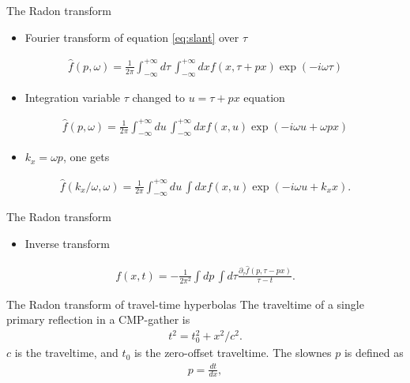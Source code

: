 \documentclass[xcolor=dvipsnames,notes]{beamer}
\begin{document}
%
\begin{frame}{The Radon transform}
\begin{itemize}
 \item Fourier transform of equation \eqref{eq:slant} over $\tau$
\end{itemize}
%
\begin{eqnarray}
  \hat{f}(p,\omega) =   
      \frac{1}{2\pi}\int^{+\infty}_{-\infty}d\tau\,\int^{+\infty}_{-\infty} dx f(x,\tau+px)\exp(-i\omega\tau) 
                   \label{eq:slant-four}
\end{eqnarray}
%
\begin{itemize}
\item Integration variable $\tau$  changed to $u=\tau+px$ equation
\end{itemize}
\begin{eqnarray}
  \hat{f}(p,\omega) =
      \frac{1}{2\pi}\int^{+\infty}_{-\infty}du\,\int^{+\infty}_{-\infty} dx f(x,u)\exp(-i\omega u + \omega px)
                   \label{eq:slant-four2}
\end{eqnarray}
\begin{itemize}
 \item $k_x = \omega p$, one gets
\end{itemize}
\begin{eqnarray}
  \hat{f}(k_x/\omega,\omega) =
      \frac{1}{2\pi}\int^{+\infty}_{-\infty}du\,\int dx f(x,u)\exp(-i\omega u + k_x x).
                   \label{eq:slant-four2b}
\end{eqnarray}
\end{frame}
\begin{frame}{The Radon transform}
\sf
\begin{itemize}
  \item Inverse transform
\end{itemize}
%
\begin{eqnarray}
  f(x,t) = -\frac{1}{2\pi^2}\int dp\,\int d\tau\frac{\partial_{\tau}\hat{f}(p,\tau-px)} 
                                                   {\tau-t}.         
\end{eqnarray}
%
\end{frame}
%
\begin{frame}{The Radon transform of travel-time hyperbolas}
The traveltime of a single primary reflection in a CMP-gather is
%
\begin{eqnarray}
t^2 = t^2_0 + x^2/c^2 . 
    \label{eq:5-hyp}
\end{eqnarray}
%
$c$ is the traveltime, and $t_0$ is the zero-offset traveltime.
The slownes $p$ is defined as
%
\begin{eqnarray}
  p = \frac{dt}{dx}, 
    \label{eq:5-pdef}
\end{eqnarray}
%
\end{frame}
\end{document}

